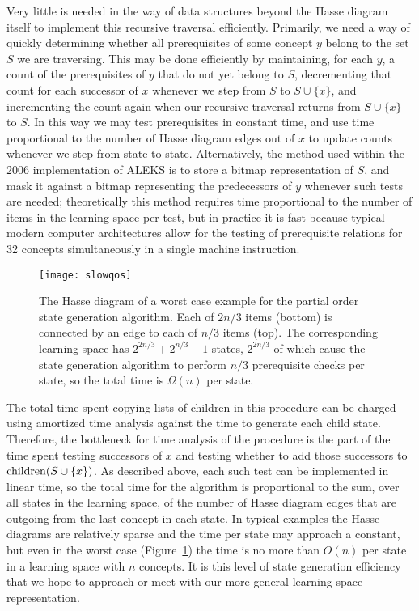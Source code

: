 \documentclass[11pt]{llncs}
\begin{document}
{Very little is needed in the way of data structures beyond the Hasse diagram itself to implement this recursive traversal efficiently. Primarily, we need a way of quickly determining whether all prerequisites of some concept $y$ belong to the set $S$ we are traversing.  This may be done efficiently by maintaining, for each $y$, a count of the prerequisites of $y$ that do not yet belong to $S$, decrementing that count for each successor of $x$ whenever we step from $S$ to $S\cup\{x\}$, and incrementing the count again when our recursive traversal returns from $S\cup\{x\}$ to $S$. In this way we may test prerequisites in constant time, and use time proportional to the number of Hasse diagram edges out of $x$ to update counts whenever we step from state to state. Alternatively, the method used within the 2006 implementation of ALEKS is to store a bitmap representation of $S$, and mask it against a bitmap representing the predecessors of $y$ whenever such tests are needed; theoretically this method requires time proportional to the number of items in the learning space per test, but in practice it is fast because typical modern computer architectures allow for the testing of prerequisite relations for 32 concepts simultaneously in a single machine instruction.

\begin{figure}[t]
\centering\texttt{[image: slowqos]}
\caption{The Hasse diagram of a worst case example for the partial order state generation algorithm.
Each of $2n/3$ items (bottom) is connected by an edge to each of $n/3$ items (top).
The corresponding learning space has $2^{2n/3}+2^{n/3}-1$ states, $2^{2n/3}$ of which cause the state generation algorithm to perform $n/3$ prerequisite checks per state, so the total time is $\Omega(n)$ per state.}
\label{fig:slowqos}
\end{figure}

The total time spent copying lists of children in this procedure can be charged using amortized time analysis against the time to generate each child state. Therefore, the bottleneck for time analysis of the procedure is the part of the time spent testing successors of $x$ and testing whether to add those successors to ${\rm children}(S\cup\{x\})$. As described above, each such test can be implemented in linear time, so the total time for the algorithm is proportional to the sum, over all states in the learning space, of the number of Hasse diagram edges that are outgoing from the last concept in each state. In typical examples the Hasse diagrams are relatively sparse and the time per state may approach a constant, but even in the worst case (Figure~\ref{fig:slowqos}) the time is no more than $O(n)$ per state in a learning space with $n$ concepts. It is this level of state generation efficiency that we hope to approach or meet with our more general learning space representation.

}
\end{document}
